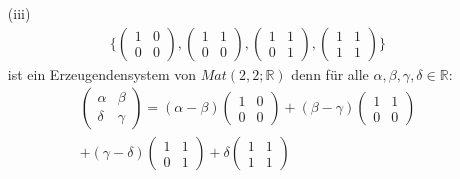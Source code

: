 \documentclass[11pt]{report}
\newcommand*\Zb[1] {\mathbb{#1}}
\begin{document}
\begin{itemize}
\item[(iii)] 
\begin{align}
 \{\begin{pmatrix} 1  & 0 \\ 0 & 0 \end{pmatrix}, \begin{pmatrix} 1  & 1 \\ 0 & 0 \end{pmatrix}, \begin{pmatrix} 1  & 1 \\ 0 & 1 \end{pmatrix}, \begin{pmatrix} 1  & 1 \\ 1 & 1 \end{pmatrix}\}
\end{align}
 ist ein Erzeugendensystem von $Mat(2, 2; \Zb{R})$ denn für alle $\alpha, \beta, \gamma, \delta \in \Zb{R}$:
\begin{align}
 \begin{pmatrix} \alpha  & \beta \\ \delta & \gamma \end{pmatrix} = (\alpha-\beta)\begin{pmatrix} 1  & 0 \\ 0 & 0 \end{pmatrix} + (\beta-\gamma)\begin{pmatrix} 1  & 1 \\ 0 & 0 \end{pmatrix} \\ + (\gamma-\delta)\begin{pmatrix} 1  & 1 \\ 0 & 1 \end{pmatrix} + \delta \begin{pmatrix} 1  & 1 \\ 1 & 1 \end{pmatrix}
\end{align}
\end{itemize}

\end{document}
